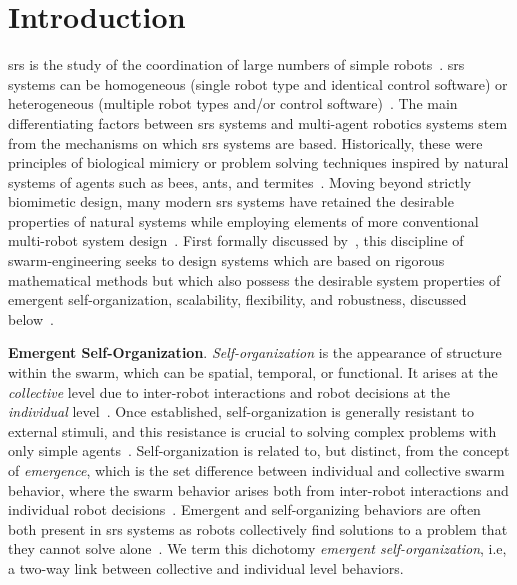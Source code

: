 \chapter{Introduction}\label{chap:intro}

\gls{srs} is the study of the coordination of large numbers of simple
robots~\cite{Sahin2005}. \gls{srs} systems can be homogeneous (single robot type
and identical control software) or heterogeneous (multiple robot types and/or
control software)~\cite{Dorigo2013,Rizk2019,Ramachandran2020}. The main
differentiating factors between \gls{srs} systems and multi-agent robotics
systems stem from the mechanisms on which \gls{srs} systems are based.
Historically, these were principles of biological mimicry or problem solving
techniques inspired by natural systems of agents such as bees, ants, and
termites~\cite{Labella2006}. Moving beyond strictly biomimetic design, many
modern \gls{srs} systems have retained the desirable properties of natural
systems while employing elements of more conventional multi-robot system
design~\cite{Castello2016,Arvin2015,Steyven2018}.  First formally discussed
by~\cite{Winfield2005}, this discipline of \gls{swarm-engineering} seeks to
design systems which are based on rigorous mathematical methods but which also
possess the desirable system properties of emergent self-organization,
scalability, flexibility, and robustness, discussed
below~\cite{Brambilla2013a}.

\textbf{Emergent Self-Organization}. \emph{Self-organization} is the appearance
of structure within the swarm, which can be spatial, temporal, or functional. It
arises at the \emph{collective} level due to inter-robot interactions and robot
decisions at the \emph{individual} level~\cite{Winfield2005a,Galstyan2005}. Once
established, self-organization is generally resistant to external stimuli, and
this resistance is crucial to solving complex problems with only simple
agents~\cite{Hunt2020,DeWolf2005}.  Self-organization is related to, but
distinct, from the concept of \emph{emergence}, which is the set difference
between individual and collective swarm behavior, where the swarm behavior
arises both from inter-robot interactions and individual robot
decisions~\cite{Szabo2014,DeWolf2005}.  Emergent and self-organizing behaviors
are often both present in \gls{srs} systems as robots collectively find solutions
to a problem that they cannot solve alone~\cite{Cotsaftis2009,Hunt2020}. We term
this dichotomy \emph{emergent self-organization}, i.e, a two-way link between
collective and individual level behaviors.


